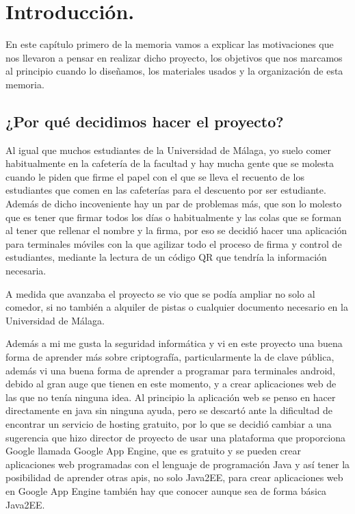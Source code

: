 \chapter{Introducción.}
En este capítulo primero de la memoria vamos a explicar las motivaciones que nos llevaron a pensar en realizar dicho proyecto, los objetivos que nos marcamos al principio cuando lo diseñamos, los materiales usados y la organización de esta memoria.

\section{¿Por qué decidimos hacer el proyecto?}
Al igual que muchos estudiantes de la Universidad de Málaga, yo suelo comer habitualmente en la cafetería de la facultad y hay mucha gente que se molesta cuando le piden que firme el papel con el que se lleva el recuento de los estudiantes que comen en las cafeterías para el descuento por ser estudiante. Además de dicho incoveniente hay un par de problemas más, que son lo molesto que es tener que firmar todos los días o habitualmente y las colas que se forman al tener que rellenar el nombre y la firma, por eso se decidió hacer una aplicación para terminales móviles con la que agilizar todo el proceso de firma y control de estudiantes, mediante la lectura de un código QR que tendría la información necesaria.

A medida que avanzaba el proyecto se vio que se podía ampliar no solo al comedor, si no también a alquiler de pistas o cualquier documento necesario en la Universidad de Málaga.

Además a mi me gusta la seguridad informática y vi en este proyecto una buena forma de aprender más sobre criptografía, particularmente la de clave pública, además vi una buena forma de aprender a programar para terminales android, debido al gran auge que tienen en este momento, y a crear aplicaciones web de las que no tenía ninguna idea. Al principio la aplicación web se penso en hacer directamente en java sin ninguna ayuda, pero se descartó ante la dificultad de encontrar un servicio de hosting gratuito, por lo que se decidió cambiar a una sugerencia que hizo director de proyecto de usar una plataforma que proporciona Google llamada Google App Engine, que es gratuito y se pueden crear aplicaciones web programadas con el lenguaje de programación Java y así tener la posibilidad de aprender otras apis, no solo Java2EE, para crear aplicaciones web en Google App Engine también hay que conocer aunque sea de forma básica Java2EE.

